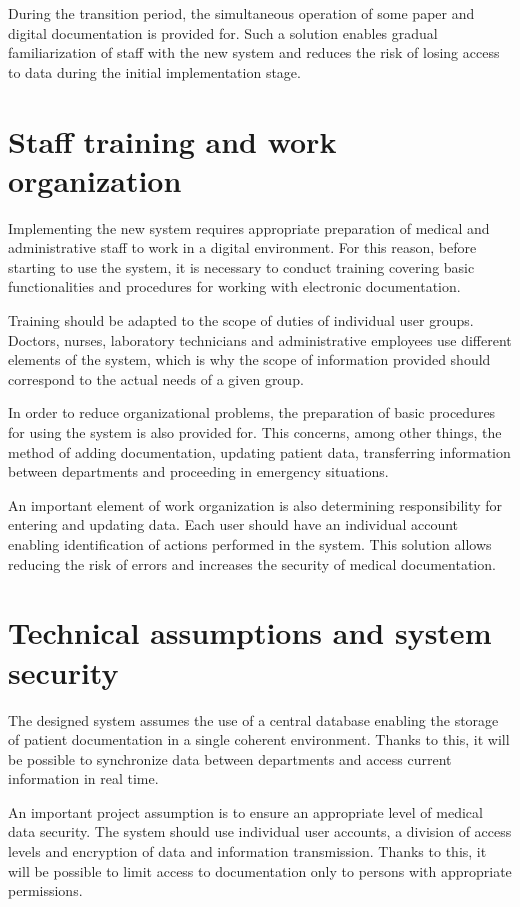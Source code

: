 During the transition period, the simultaneous operation of some paper and digital documentation is provided for. Such a solution enables gradual familiarization of staff with the new system and reduces the risk of losing access to data during the initial implementation stage.

\section{Staff training and work organization}

Implementing the new system requires appropriate preparation of medical and administrative staff to work in a digital environment. For this reason, before starting to use the system, it is necessary to conduct training covering basic functionalities and procedures for working with electronic documentation.

Training should be adapted to the scope of duties of individual user groups. Doctors, nurses, laboratory technicians and administrative employees use different elements of the system, which is why the scope of information provided should correspond to the actual needs of a given group.

In order to reduce organizational problems, the preparation of basic procedures for using the system is also provided for. This concerns, among other things, the method of adding documentation, updating patient data, transferring information between departments and proceeding in emergency situations.

An important element of work organization is also determining responsibility for entering and updating data. Each user should have an individual account enabling identification of actions performed in the system. This solution allows reducing the risk of errors and increases the security of medical documentation.

\section{Technical assumptions and system security}

The designed system assumes the use of a central database enabling the storage of patient documentation in a single coherent environment. Thanks to this, it will be possible to synchronize data between departments and access current information in real time.

An important project assumption is to ensure an appropriate level of medical data security. The system should use individual user accounts, a division of access levels and encryption of data and information transmission. Thanks to this, it will be possible to limit access to documentation only to persons with appropriate permissions.

